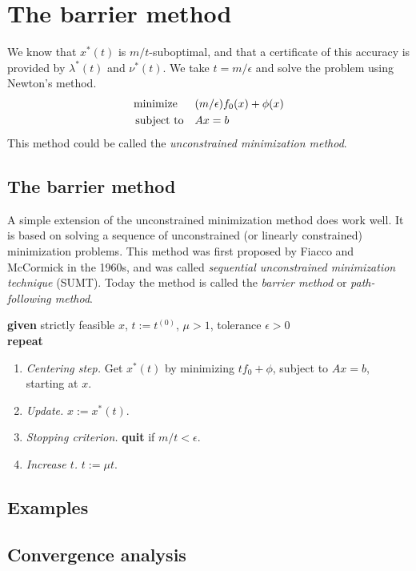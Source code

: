 \section{The barrier method}
We know that $x^\ast(t)$ is $m/t$-suboptimal, and that a certificate of this accuracy is provided by $\lambda^\ast(t)$ and $\nu^\ast(t)$.
We take $t=m/\epsilon$ and solve the problem using Newton's method.
\begin{align*}
  \text{minimize\;\;}\quad& (m/\epsilon)f_0(x)+\phi(x)\\
  \text{subject to}  \quad& Ax=b
\end{align*}
This method could be called the \textit{unconstrained minimization method}.

\subsection{The barrier method}
A simple extension of the unconstrained minimization method does work well.
It is based on solving a sequence of unconstrained (or linearly constrained) minimization problems.
This method was first proposed by Fiacco and McCormick in the 1960s, and was called \textit{sequential unconstrained minimization technique} (SUMT).
Today the method is called the \textit{barrier method} or \textit{path-following method}.
\begin{algorithm}
  $ $\\
  \textbf{given} strictly feasible $x$, $t:=t^{(0)}$, $\mu>1$, tolerance $\epsilon>0$\\
  \textbf{repeat}
  \begin{enumerate}
    \item \textit{Centering step.} Get $x^\ast(t)$ by minimizing $tf_0+\phi$, subject to $Ax=b$, starting at $x$.
    \item \textit{Update.} $x:=x^\ast(t)$.
    \item \textit{Stopping criterion.} \textbf{quit} if $m/t<\epsilon$.
    \item \textit{Increase $t$.} $t:=\mu t$.
  \end{enumerate}
\end{algorithm}

\subsection{Examples}

\subsection{Convergence analysis}

